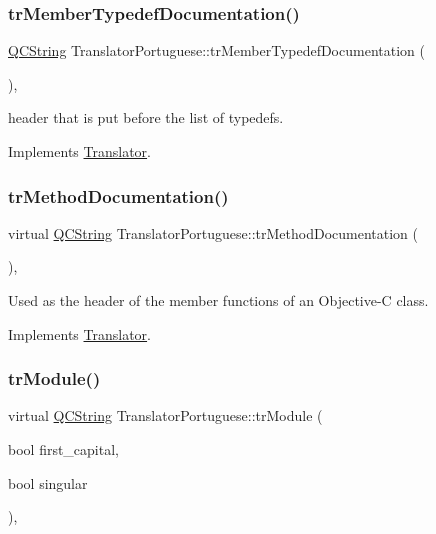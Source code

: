 \subsubsection{\texorpdfstring{trMemberTypedefDocumentation()}{trMemberTypedefDocumentation()}}
{\footnotesize\ttfamily \mbox{\hyperlink{class_q_c_string}{Q\+C\+String}} Translator\+Portuguese\+::tr\+Member\+Typedef\+Documentation (\begin{DoxyParamCaption}{ }\end{DoxyParamCaption})\hspace{0.3cm}{\ttfamily [inline]}, {\ttfamily [virtual]}}

header that is put before the list of typedefs. 

Implements \mbox{\hyperlink{class_translator}{Translator}}.

\mbox{\label{class_translator_portuguese_a4c0b66791650c86f54b89f04a8d447a4}} 
\subsubsection{\texorpdfstring{trMethodDocumentation()}{trMethodDocumentation()}}
{\footnotesize\ttfamily virtual \mbox{\hyperlink{class_q_c_string}{Q\+C\+String}} Translator\+Portuguese\+::tr\+Method\+Documentation (\begin{DoxyParamCaption}{ }\end{DoxyParamCaption})\hspace{0.3cm}{\ttfamily [inline]}, {\ttfamily [virtual]}}

Used as the header of the member functions of an Objective-\/C class. 

Implements \mbox{\hyperlink{class_translator}{Translator}}.

\mbox{\label{class_translator_portuguese_a2b017c1d873be108d2f36647750e49bd}} 
\subsubsection{\texorpdfstring{trModule()}{trModule()}}
{\footnotesize\ttfamily virtual \mbox{\hyperlink{class_q_c_string}{Q\+C\+String}} Translator\+Portuguese\+::tr\+Module (\begin{DoxyParamCaption}\item[{bool}]{first\+\_\+capital,  }\item[{bool}]{singular }\end{DoxyParamCaption})\hspace{0.3cm}{\ttfamily [inline]}, {\ttfamily [virtual]}}

